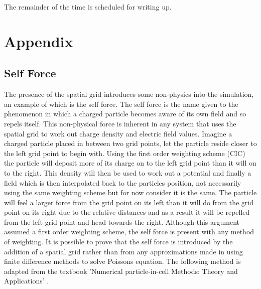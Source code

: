 \documentclass[12pt]{article}
\begin{document}
The remainder of the time is scheduled for writing up.










\newpage
\section{Appendix}
\subsection{Self Force}
The presence of the spatial grid introduces some non-physics into the simulation, an example of which is the self force. The self force is the name given to the phenomenon in which a charged particle becomes aware of its own field and so repels itself. This non-physical force is inherent in any system that uses the spatial grid to work out charge density and electric field values. Imagine a charged particle placed in between two grid points, let the particle reside closer to the left grid point to begin with. Using the first order weighting scheme (CIC) the particle will deposit more of its charge on to the left grid point than it will on to the right. This density will then be used to work out a potential and finally a field which is then interpolated back to the particles position, not necessarily using the same weighting scheme but for now consider it is the same. The particle will feel a larger force from the grid point on its left than it will do from the grid point on its right due to the relative distances and as a result it will be repelled from the left grid point and head towards the right. Although this argument assumed a first order weighting scheme, the self force is present with any method of weighting. 
It is possible to prove that the self force is introduced by the addition of a spatial grid rather than from any approximations made in using finite difference methods to solve Poissons equation. The following method is adapted from the textbook 'Numerical particle-in-cell Methods: Theory and Applications' \cite{selfforce}. 
\end{document}
